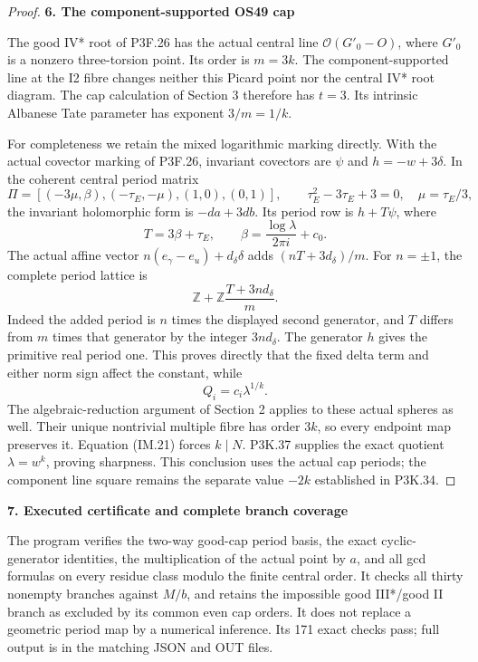 \begin{proof}
\par

\medskip\noindent\textbf{6. The component-supported OS49 cap}

\par\nobreak

The good IV* root of P3F.26 has the actual central line
\(\mathcal O(G'_0-O)\), where \(G'_0\) is a nonzero
three-torsion point. Its order is \(m=3k\). The component-supported
line at the I2 fibre changes neither this Picard point nor the
central IV* root diagram. The cap calculation of Section 3 therefore
has \(t=3\). Its intrinsic Albanese Tate parameter has exponent
\(3/m=1/k\).

For completeness we retain the mixed logarithmic marking directly.
With the actual covector marking of P3F.26, invariant covectors are
\(\psi\) and \(h=-w+3\delta\). In the coherent central period
matrix
\[
 \Pi=[(-3\mu,\beta),(-\tau_E,-\mu),(1,0),(0,1)],
 \qquad \tau_E^2-3\tau_E+3=0,\quad \mu=\tau_E/3,
\]
the invariant holomorphic form is \(-da+3db\). Its period row
is \(h+T\psi\), where
\[
 T=3\beta+\tau_E,
 \qquad \beta=\frac{\log\lambda}{2\pi i}+c_0.
\]
The actual affine vector
\(n(e_\gamma-e_u)+d_\delta\delta\) adds
\((nT+3d_\delta)/m\). For \(n=\pm1\), the complete period
lattice is
\[
 \mathbb Z+\mathbb Z\frac{T+3nd_\delta}{m}.
                                                               \tag{IM.25}
\]
Indeed the added period is \(n\) times the displayed second
generator, and \(T\) differs from \(m\) times that generator
by the integer \(3nd_\delta\). The generator \(h\) gives the
primitive real period one. This proves directly that the fixed
delta term and either norm sign affect the constant, while
\[
                        Q_i=c_i\lambda^{1/k}.          \tag{IM.26}
\]
The algebraic-reduction argument of Section 2 applies to these
actual spheres as well. Their unique nontrivial multiple fibre has
order \(3k\), so every endpoint map preserves it. Equation (IM.21)
forces \(k\mid N\). P3K.37 supplies the exact quotient
\(\lambda=w^k\), proving sharpness. This conclusion uses the
actual cap periods; the component line square remains the separate
value \(-2k\) established in P3K.34.
\end{proof}
\par

\medskip\noindent\textbf{7. Executed certificate and complete branch coverage}

\par\nobreak

The program  verifies the
two-way good-cap period basis, the exact cyclic-generator identities,
the multiplication of the actual point by \(a\), and all gcd
formulas on every residue class modulo the finite central order.
It checks all thirty nonempty branches against \(M/b\), and
retains the impossible good III*/good II branch as excluded by its
common even cap orders. It does not replace a geometric period map
by a numerical inference. Its 171 exact checks pass; full output is
in the matching JSON and OUT files.

